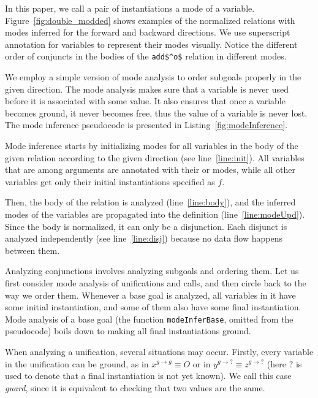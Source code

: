 In this paper, we call a pair of instantiations a mode of a variable.
Figure~\ref{fig:double_modded} shows examples of the normalized relations with modes inferred for the forward and backward directions.
We use superscript annotation for variables to represent their modes visually.
Notice the different order of conjuncts in the bodies of the \lstinline{add$^o$} relation in different modes.


We employ a simple version of mode analysis to order subgoals properly in the given direction.
The mode analysis makes sure that a variable is never used before it is associated with some value.
It also ensures that once a variable becomes ground, it never becomes free, thus the value of a variable is never lost.
The mode inference pseudocode is presented in Listing~\ref{fig:modeInference}.





Mode inference starts by initializing modes for all variables in the body of the given relation according to the given direction (see line~\ref{line:init}).
All variables that are among arguments are annotated with their \inm or \outm modes, while all other variables get only their initial instantiations specified as $f$.

Then, the body of the relation is analyzed (line~\ref{line:body}), and the inferred modes of the variables are propagated into the definition (line~\ref{line:modeUpd}).
Since the body is normalized, it can only be a disjunction.
Each disjunct is analyzed independently (see line~\ref{line:disj}) because no data flow happens between them.

Analyzing conjunctions involves analyzing subgoals and ordering them.
Let us first consider mode analysis of unifications and calls, and then circle back to the way we order them.
Whenever a base goal is analyzed, all variables in it have some initial instantiation, and some of them also have some final instantiation.
Mode analysis of a base goal (the function \lstinline{modeInferBase}, omitted from the pseudocode) boils down to making all final instantiations ground.

When analyzing a unification, several situations may occur.
Firstly, every variable in the unification can be ground, as in $x^{g \rightarrow g} \equiv O$ or in $y^{g \rightarrow ?} \equiv z^{g \rightarrow ?}$ (here $?$ is used to denote that a final instantiation is not yet known).
We call this case \emph{guard}, since it is equivalent to checking that two values are the same.

